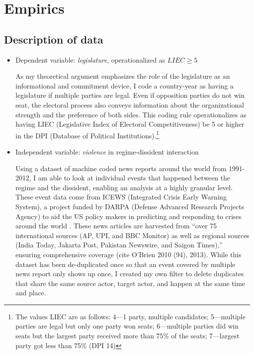 \section{Empirics}

\subsection{Description of data}

\begin{itemize}

\item Dependent variable: \textit{legislature}, operationalized as $LIEC \geq 5$ 

As my theoretical argument emphasizes the role of the legislature as an informational and commitment device, I code a country-year as having a legislature if multiple parties are legal. Even if opposition parties do not win seat, the electoral process also conveys information about the organizational strength and the preference of both sides. This coding rule operationalizes as having LIEC (Legislative Index of Electoral Competitiveness) be 5 or higher in the DPI (Database of Political Institutions).\footnote{The values LIEC are as follows: 4---1 party, multiple candidates; 5---multiple parties are legal but only one party won seats; 6---multiple parties did win seats but the largest party received more than 75\% of the seats; 7---largest party got less than 75\% (DPI 14)}

\item Independent variable: \textit{violence} in regime-dissident interaction

Using a dataset of machine coded news reports around the world from 1991-2012, I am able to look at individual events that happened between the regime and the dissident, enabling an analysis at a highly granular level. These event data come from ICEWS (Integrated Crisis Early Warning System), a project funded by DARPA (Defense Advanced Research Projects Agency) to aid the US policy makers in predicting and responding to crises around the world . These news articles are harvested from ``over 75 international sources (AP, UPI, and BBC Monitor) as well as regional sources (India Today, Jakarta Post, Pakistan Newswire, and Saigon Times),'' ensuring comprehensive coverage  (cite O'Brien 2010 (94), 2013). While this dataset has been de-duplicated once so that an event covered by multiple news report only shows up once, I created my own filter to delete duplicates that share the same source actor, target actor, and happen at the same time and place.


\end{itemize}
